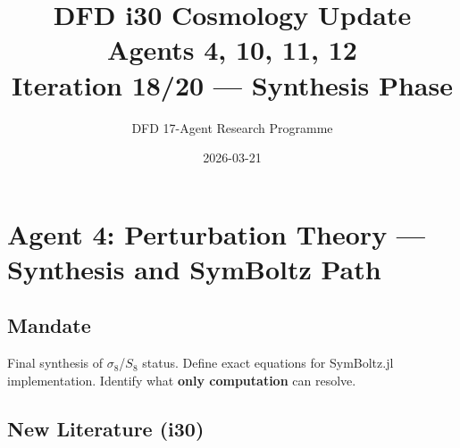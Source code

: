 \documentclass[11pt,a4paper]{article}
\title{DFD i30 Cosmology Update\\Agents 4, 10, 11, 12\\[6pt]\large Iteration 18/20 --- Synthesis Phase}
\author{DFD 17-Agent Research Programme}
\date{2026-03-21}
\begin{document}
\maketitle
\tableofcontents
\newpage

\section{Agent 4: Perturbation Theory --- Synthesis and SymBoltz Path}

\subsection{Mandate}
Final synthesis of $\sigma_8$/$S_8$ status. Define exact equations for SymBoltz.jl implementation. Identify what \textbf{only computation} can resolve.

\subsection{New Literature (i30)}
\end{document}
